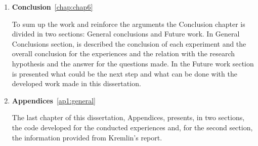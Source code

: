 \begin{enumerate}
	\item \textbf{Conclusion}~\ref{chap:chap6}

To sum up the work and reinforce the arguments the Conclusion chapter is divided in two sections: General conclusions and Future work. In General Conclusions section, is described the conclusion of each experiment and the overall conclusion for the experiences and the relation with the research hypothesis and the answer for the questions made. In the Future work section is presented what could be the next step and what can be done with the developed work made in this dissertation. 

	\item \textbf{Appendices}~\ref{ap1:general}
	
The last chapter of this dissertation, Appendices, presents, in two sections, the code developed for the conducted experiences and, for the second section, the information provided from Kremlin's report.

\end{enumerate}

